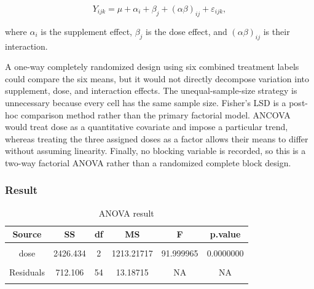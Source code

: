 \documentclass[
  11pt,
]{article}
\begin{document}
\[
Y_{ijk}=\mu+\alpha_i+\beta_j+(\alpha\beta)_{ij}+\varepsilon_{ijk},
\]

where \(\alpha_i\) is the supplement effect, \(\beta_j\) is the dose
effect, and \((\alpha\beta)_{ij}\) is their interaction.

A one-way completely randomized design using six combined treatment
labels could compare the six means, but it would not directly decompose
variation into supplement, dose, and interaction effects. The
unequal-sample-size strategy is unnecessary because every cell has the
same sample size. Fisher's LSD is a post-hoc comparison method rather
than the primary factorial model. ANCOVA would treat dose as a
quantitative covariate and impose a particular trend, whereas treating
the three assigned doses as a factor allows their means to differ
without assuming linearity. Finally, no blocking variable is recorded,
so this is a two-way factorial ANOVA rather than a randomized complete
block design.

\subsubsection{Result}\label{result}

\begin{table}[!h]
\centering
\caption{\label{tab:anova}ANOVA result}
\centering
\fontsize{10}{12}\selectfont
\begin{tabular}[t]{cccccc}
\toprule
\textbf{Source} & \textbf{SS} & \textbf{df} & \textbf{MS} & \textbf{F} & \textbf{p.value}\\
\midrule
\cellcolor{gray!10}{supp} & \cellcolor{gray!10}{205.350} & \cellcolor{gray!10}{1} & \cellcolor{gray!10}{205.35000} & \cellcolor{gray!10}{15.571979} & \cellcolor{gray!10}{0.0002312}\\
dose & 2426.434 & 2 & 1213.21717 & 91.999965 & 0.0000000\\
\cellcolor{gray!10}{supp:dose} & \cellcolor{gray!10}{108.319} & \cellcolor{gray!10}{2} & \cellcolor{gray!10}{54.15950} & \cellcolor{gray!10}{4.106991} & \cellcolor{gray!10}{0.0218603}\\
Residuals & 712.106 & 54 & 13.18715 & NA & NA\\
\cellcolor{gray!10}{Total} & \cellcolor{gray!10}{3452.209} & \cellcolor{gray!10}{59} & \cellcolor{gray!10}{NA} & \cellcolor{gray!10}{NA} & \cellcolor{gray!10}{NA}\\
\bottomrule
\end{tabular}
\end{table}
\end{document}
